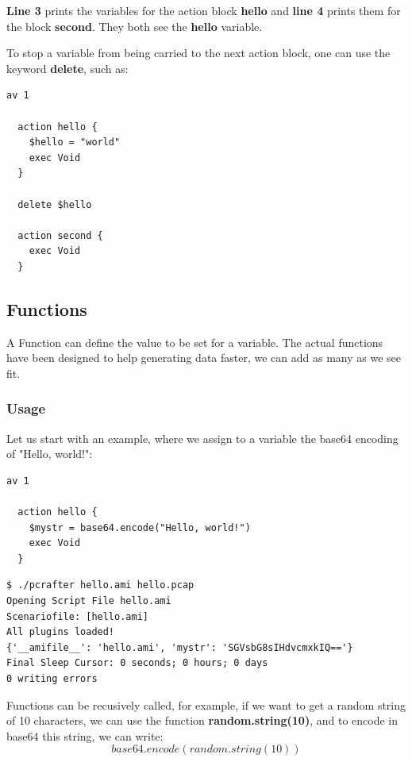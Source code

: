 \documentclass[10pt]{article}
\begin{document}
\textbf{Line 3} prints the variables for the action block \textbf{hello} and \textbf{line 4}  prints them for the block \textbf{second}. They both see the \textbf{hello} variable.

To stop a variable from being carried to the next action block, one can use the keyword \textbf{delete}, such as:
\begin{lstlisting}[caption={Deleting our variable},captionpos=b]
  av 1

  action hello {
    $hello = "world"
    exec Void
  }

  delete $hello
  
  action second {
    exec Void
  }
\end{lstlisting}

\subsection{Functions}

A Function can define the value to be set for a variable. The actual functions have been designed to help generating data faster, we can add as many as we see fit.

\subsubsection{Usage}
Let us start with an example, where we assign to a variable the base64 encoding of "Hello, world!":
\begin{lstlisting}[caption={Encoding a string},captionpos=b]
  av 1

  action hello {
    $mystr = base64.encode("Hello, world!")
    exec Void
  }
\end{lstlisting}

\begin{lstlisting}[caption={Seeing our encoded string},captionpos=b]
$ ./pcrafter hello.ami hello.pcap
Opening Script File hello.ami
Scenariofile: [hello.ami]
All plugins loaded!
{'__amifile__': 'hello.ami', 'mystr': 'SGVsbG8sIHdvcmxkIQ=='}
Final Sleep Cursor: 0 seconds; 0 hours; 0 days
0 writing errors
\end{lstlisting}

Functions can be recusively called, for example, if we want to get a random string of 10 characters, we can use the function \textbf{random.string(10)}, and to encode in base64 this string, we can write:
\begin{equation}
  \boxed{base64.encode(random.string(10))}
\end{equation}
\end{document}
